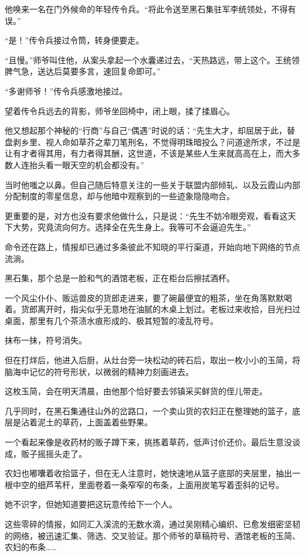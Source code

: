 他唤来一名在门外候命的年轻传令兵。“将此令送至黑石集驻军李统领处，不得有误。”

“是！”传令兵接过令筒，转身便要走。

“且慢。”师爷叫住他，从案头拿起一个水囊递过去，“天热路远，带上这个。王统领脾气急，送达后莫要多言，速回复命即可。”

“多谢师爷！”传令兵感激地接过。

望着传令兵远去的背影，师爷坐回椅中，闭上眼，揉了揉眉心。

他又想起那个神秘的“行商”与自己“偶遇”时说的话：“先生大才，却屈居于此，替盘剥乡里、视人命如草芥之辈刀笔刑名，不觉得明珠暗投么？问道途所求，不过是让有才者得其用，有力者得其酬，这世道，不该是某些人生来就高高在上，而大多数人连抬头看一眼天空的机会都没有。”

当时他嗤之以鼻。但自己随后特意关注的一些关于联盟内部倾轧、以及云霞山内部分配制度的零星信息，却与他暗中观察到的一些迹象隐隐吻合。

更重要的是，对方也没有要求他做什么，只是说：“先生不妨冷眼旁观，看看这天下大势，究竟流向何方。选择全在先生身上。我等可不会逼迫先生。”

\vspace{2em}

命令还在路上，情报却已通过多条彼此不知晓的平行渠道，开始向地下网络的节点流淌。

黑石集，那个总是一脸和气的酒馆老板，正在柜台后擦拭酒杯。

一个风尘仆仆、贩运兽皮的货郎走进来，要了碗最便宜的粗茶，坐在角落默默喝着。货郎离开时，指尖似乎无意地在油腻的木桌上划过。老板过来收拾，目光扫过桌面，那里有几个茶渍水痕形成的、极其短暂的凌乱符号。

抹布一抹，符号消失。

但在打烊后，他进入后厨，从灶台旁一块松动的砖石后，取出一枚小小的玉简，将脑海中记忆的符号形状，以微弱的精神力刻画进去。

这枚玉简，会在明天清晨，由他那个恰好要去邻镇采买鲜货的侄儿带走。

几乎同时，在黑石集通往山外的岔路口，一个卖山货的农妇正在整理她的篮子，底层是沾着泥土的草药，上面盖着些野果。

一个看起来像是收药材的贩子蹲下来，挑拣着草药，低声讨价还价。最后生意没谈成，贩子摇摇头走了。

农妇也嘟囔着收拾篮子，但在无人注意时，她快速地从篮子底部的夹层里，抽出一根中空的细芦苇杆，里面卷着一条窄窄的布条，上面用炭笔写着歪斜的记号。

她不识字，但她知道要把这玩意传给下一个人。

这些零碎的情报，如同汇入溪流的无数水滴，通过吴刚精心编织、已愈发细密坚韧的网络，被迅速汇集、筛选、交叉验证。那个师爷的草稿符号、酒馆老板的玉简、农妇的布条……

